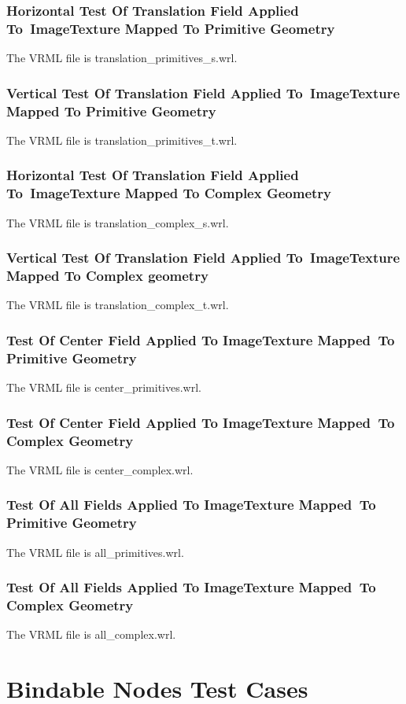 \documentclass[12pt,letterpaper]{article}
\newcounter{testCaseCtr}
\newcommand{\resetTestCase}{\setcounter{testCaseCtr}{1}}
\newcommand{\TTIa}{Horizontal Test Of Translation Field Applied To~}
\newcommand{\TTIb}{ImageTexture Mapped To Primitive Geometry}
\newcommand{\TTJa}{Vertical Test Of Translation Field Applied To~}
\newcommand{\TTJb}{ImageTexture Mapped To Primitive Geometry}
\newcommand{\TTKa}{Horizontal Test Of Translation Field Applied To~}
\newcommand{\TTKb}{ImageTexture Mapped To Complex Geometry}
\newcommand{\TTLa}{Vertical Test Of Translation Field Applied To~}
\newcommand{\TTLb}{ImageTexture Mapped To Complex geometry}
\newcommand{\TTMa}{Test Of Center Field Applied To ImageTexture Mapped~}
\newcommand{\TTMb}{To Primitive Geometry}
\newcommand{\TTNa}{Test Of Center Field Applied To ImageTexture Mapped~}
\newcommand{\TTNb}{To Complex Geometry}
\newcommand{\TTOa}{Test Of All Fields Applied To ImageTexture Mapped~}
\newcommand{\TTOb}{To Primitive Geometry}
\newcommand{\TTPa}{Test Of All Fields Applied To ImageTexture Mapped~}
\newcommand{\TTPb}{To Complex Geometry}
\begin{document}
\subsubsection{\TTIa\TTIb}
\label{sec:translation}
The VRML file is translation\_primitives\_s.wrl.\newline

\subsubsection{\TTJa\TTJb}
The VRML file is translation\_primitives\_t.wrl.\newline

\subsubsection{\TTKa\TTKb}
The VRML file is translation\_complex\_s.wrl.\newline

\subsubsection{\TTLa\TTLb}
The VRML file is translation\_complex\_t.wrl.\newline

\subsubsection{\TTMa\TTMb}
The VRML file is center\_primitives.wrl.\newline

\subsubsection{\TTNa\TTNb}
The VRML file is center\_complex.wrl.\newline

\subsubsection{\TTOa\TTOb}
The VRML file is all\_primitives.wrl.\newline

\subsubsection{\TTPa\TTPb}
The VRML file is all\_complex.wrl.\newline

\newpage
\section{Bindable Nodes Test Cases}
\resetTestCase
\end{document}
